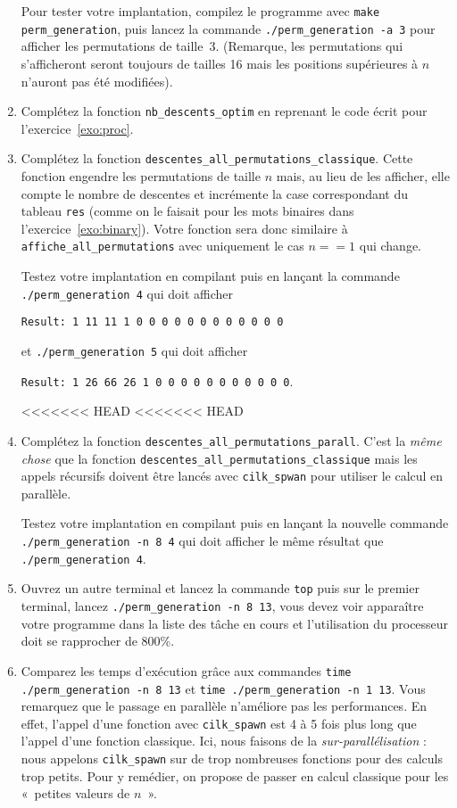 \documentclass{cours}
\newcommand{\lsti}[1]{\lstinline{#1}{}}
\begin{document}
\begin{exercice}
\begin{enumerate}
Pour tester votre implantation, compilez le programme avec \lsti{make perm_generation}, puis lancez la commande \lsti{./perm_generation -a 3} pour afficher les permutations de taille~3. (Remarque, les permutations qui s'afficheront seront toujours de tailles 16 mais les positions supérieures à $n$ n'auront pas été modifiées).

\item Complétez la fonction \lsti{nb_descents_optim} en reprenant le code écrit pour l'exercice~\ref{exo:proc}.

\item Complétez la fonction \lsti{descentes_all_permutations_classique}. Cette fonction engendre les permutations de taille $n$ mais, au lieu de les afficher, elle compte le nombre de descentes et incrémente la case correspondant du tableau \lsti{res} (comme on le faisait pour les mots binaires dans l'exercice~\ref{exo:binary}). Votre fonction sera donc similaire à \lsti{affiche_all_permutations} avec uniquement le cas $n==1$ qui change.

Testez votre implantation en compilant puis en lançant la commande \lsti{./perm_generation 4} qui doit afficher

\lsti{Result: 1 11 11 1 0 0 0 0 0 0 0 0 0 0 0 0}

et \lsti{./perm_generation 5} qui doit afficher 

\lsti{Result: 1 26 66 26 1 0 0 0 0 0 0 0 0 0 0 0}.

<<<<<<< HEAD
<<<<<<< HEAD
\item Complétez la fonction \lsti{descentes_all_permutations_parall}. C'est la
  \textit{même chose} que la fonction \lsti{descentes_all_permutations_classique} mais les appels récursifs doivent être lancés avec \lsti{cilk_spwan} pour utiliser le calcul en parallèle. 

Testez votre implantation en compilant puis en lançant la nouvelle commande \lsti{./perm_generation -n 8 4} qui doit afficher le même résultat que \lsti{./perm_generation 4}.

\item Ouvrez un autre terminal et lancez la commande \lsti{top} puis sur le premier terminal, lancez \lsti{./perm_generation -n 8 13}, vous devez voir apparaître votre programme dans la liste des tâche en cours et l'utilisation du processeur doit se rapprocher de 800\%.

\item Comparez les temps d'exécution grâce aux commandes \lsti{time ./perm_generation -n 8 13} et \lsti{time ./perm_generation -n 1 13}. Vous remarquez que le passage en parallèle n'améliore pas les performances. En effet, l'appel d'une fonction avec \lsti{cilk_spawn} est 4  à 5 fois plus long que l'appel d'une fonction classique. Ici, nous faisons de la \textit{sur-parallélisation} : nous appelons \lsti{cilk_spawn} sur de trop nombreuses fonctions pour des calculs trop petits. Pour y remédier, on propose de passer en calcul classique pour les «~petites valeurs de $n$~». 


\end{enumerate}
\end{exercice}
\end{document}
